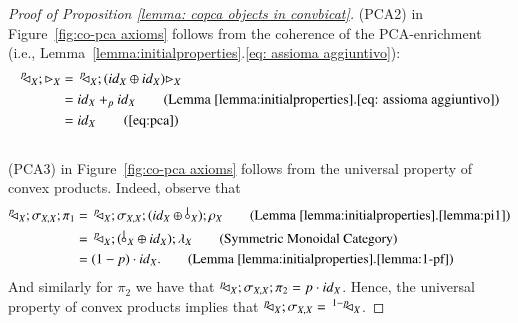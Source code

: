 \begin{proof}[Proof of Proposition \ref{lemma: copca objects in convbicat}]
    (PCA2) in Figure~\ref{fig:co-pca axioms} follows from the coherence of the PCA-enrichment (i.e.,  Lemma~\ref{lemma:initialproperties}.\ref{eq: assioma aggiuntivo}):
  \begin{align*}
    \diagp{X}; \codiag{X} &=\,   \diagp{X}; (\id{X} \oplus \id{X}) \codiag{X}\\
    &= \id{X}+_p \id{X} \tag{Lemma~\ref{lemma:initialproperties}.\ref{eq: assioma aggiuntivo}}\\
    &=\id{X} \tag{\ref{eq:pca}}
    \end{align*}
    \\

    (PCA3) in Figure~\ref{fig:co-pca axioms} follows from the universal property of convex products. Indeed, observe that
    \begin{align*}
        \diagp{X};\symm{X}{X};\pi_1 &=\, \diagp{X};\symm{X}{X};(\id{X}\piu \bang{X});\runit{X} \tag{Lemma \ref{lemma:initialproperties}.\ref{lemma:pi1}}\\
        &=\, \diagp{X};(\bang{X} \piu \id{X});\lunit{X} \tag{Symmetric Monoidal Category}\\
        &= (1-p)\cdot \id{X}. \tag{Lemma \ref{lemma:initialproperties}.\ref{lemma:1-pf}}
    \end{align*}
    And similarly for $\pi_2$ we have that $\diagp{X};\symm{X}{X};\pi_2 = p\cdot \id{X}$. Hence, the universal property of convex products implies that $\diagp{X};\symm{X}{X} =\, \diagpbar{X}$.
 \end{proof}

%
%
%
%
%

